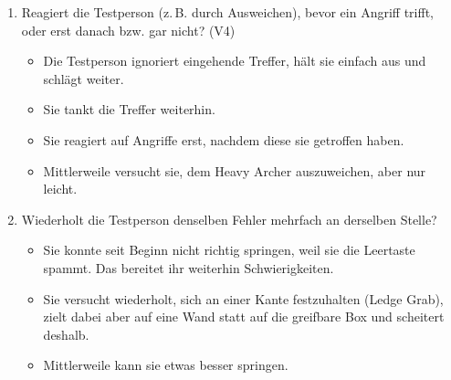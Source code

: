 \documentclass[../Main.tex]{subfiles}
\begin{document}
\begin{enumerate}[label=\textbf{B\arabic*}, leftmargin=1.5cm, itemsep=0.8em]
    \item Reagiert die Testperson (z.\,B. durch Ausweichen), bevor ein Angriff trifft, oder erst danach bzw. gar nicht? \hfill (V4)
        \begin{itemize}[nosep]
            \item Die Testperson ignoriert eingehende Treffer, hält sie einfach aus und schlägt weiter.
            \item Sie tankt die Treffer weiterhin.
            \item Sie reagiert auf Angriffe erst, nachdem diese sie getroffen haben.
            \item Mittlerweile versucht sie, dem Heavy Archer auszuweichen, aber nur leicht.
        \end{itemize}

    \item Wiederholt die Testperson denselben Fehler mehrfach an derselben Stelle?
        \begin{itemize}[nosep]
            \item Sie konnte seit Beginn nicht richtig springen, weil sie die Leertaste spammt. Das bereitet ihr weiterhin Schwierigkeiten.
            \item Sie versucht wiederholt, sich an einer Kante festzuhalten (Ledge Grab), zielt dabei aber auf eine Wand statt auf die greifbare Box und scheitert deshalb.
            \item Mittlerweile kann sie etwas besser springen.
        \end{itemize}
\end{enumerate}
\end{document}
